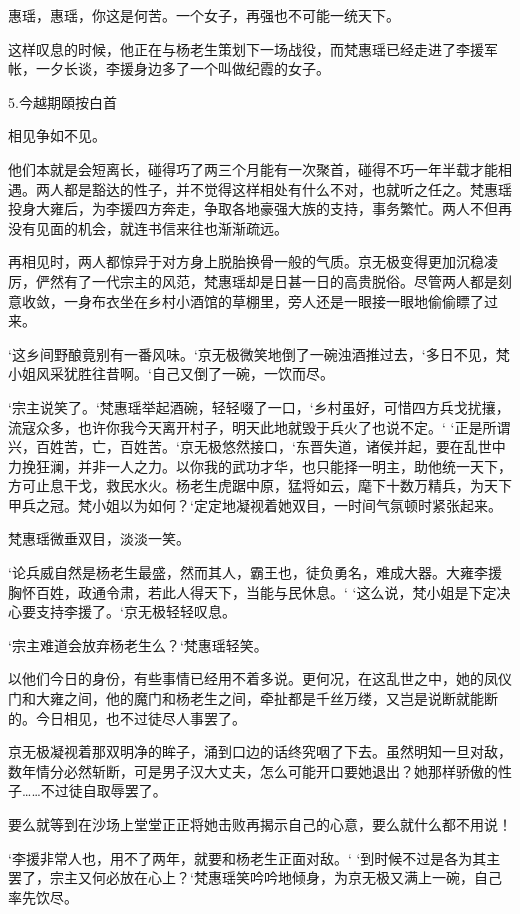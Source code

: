 惠瑶，惠瑶，你这是何苦。一个女子，再强也不可能一统天下。

这样叹息的时候，他正在与杨老生策划下一场战役，而梵惠瑶已经走进了李援军帐，一夕长谈，李援身边多了一个叫做纪霞的女子。

5.今越期頤按白首

相见争如不见。

他们本就是会短离长，碰得巧了两三个月能有一次聚首，碰得不巧一年半载才能相遇。两人都是豁达的性子，并不觉得这样相处有什么不对，也就听之任之。梵惠瑶投身大雍后，为李援四方奔走，争取各地豪强大族的支持，事务繁忙。两人不但再没有见面的机会，就连书信来往也渐渐疏远。

再相见时，两人都惊异于对方身上脱胎换骨一般的气质。京无极变得更加沉稳凌厉，俨然有了一代宗主的风范，梵惠瑶却是日甚一日的高贵脱俗。尽管两人都是刻意收敛，一身布衣坐在乡村小酒馆的草棚里，旁人还是一眼接一眼地偷偷瞟了过来。

‘这乡间野酿竟别有一番风味。‘京无极微笑地倒了一碗浊酒推过去，‘多日不见，梵小姐风采犹胜往昔啊。‘自己又倒了一碗，一饮而尽。

‘宗主说笑了。‘梵惠瑶举起酒碗，轻轻啜了一口，‘乡村虽好，可惜四方兵戈扰攘，流寇众多，也许你我今天离开村子，明天此地就毁于兵火了也说不定。‘ ‘正是所谓兴，百姓苦，亡，百姓苦。‘京无极悠然接口，‘东晋失道，诸侯并起，要在乱世中力挽狂澜，并非一人之力。以你我的武功才华，也只能择一明主，助他统一天下，方可止息干戈，救民水火。杨老生虎踞中原，猛将如云，麾下十数万精兵，为天下甲兵之冠。梵小姐以为如何？‘定定地凝视着她双目，一时间气氛顿时紧张起来。

梵惠瑶微垂双目，淡淡一笑。

‘论兵威自然是杨老生最盛，然而其人，霸王也，徒负勇名，难成大器。大雍李援胸怀百姓，政通令肃，若此人得天下，当能与民休息。‘ ‘这么说，梵小姐是下定决心要支持李援了。‘京无极轻轻叹息。

‘宗主难道会放弃杨老生么？‘梵惠瑶轻笑。

以他们今日的身份，有些事情已经用不着多说。更何况，在这乱世之中，她的凤仪门和大雍之间，他的魔门和杨老生之间，牵扯都是千丝万缕，又岂是说断就能断的。今日相见，也不过徒尽人事罢了。

京无极凝视着那双明净的眸子，涌到口边的话终究咽了下去。虽然明知一旦对敌，数年情分必然斩断，可是男子汉大丈夫，怎么可能开口要她退出？她那样骄傲的性子……不过徒自取辱罢了。

要么就等到在沙场上堂堂正正将她击败再揭示自己的心意，要么就什么都不用说！

‘李援非常人也，用不了两年，就要和杨老生正面对敌。‘ ‘到时候不过是各为其主罢了，宗主又何必放在心上？‘梵惠瑶笑吟吟地倾身，为京无极又满上一碗，自己率先饮尽。

